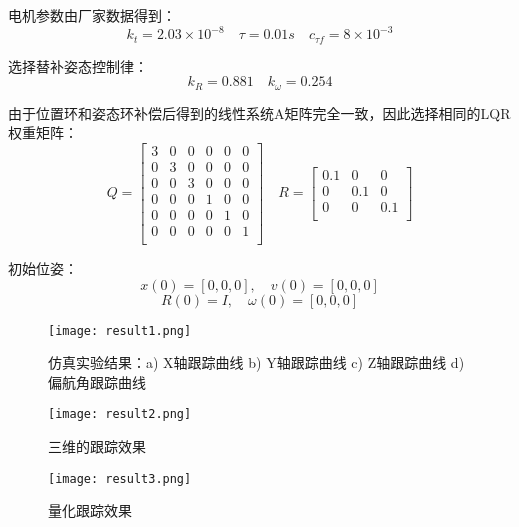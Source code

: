   电机参数由厂家数据得到：
  $$k_t=2.03\times 10^{-8} \quad 
  \tau=0.01s \quad
  c_{\tau f}=8\times 10^{-3}$$

  选择替补姿态控制律：
  $$k_R=0.881 \quad k_\omega=0.254$$

  由于位置环和姿态环补偿后得到的线性系统A矩阵完全一致，因此选择相同的LQR权重矩阵：
  $$Q=\begin{bmatrix}
    3&0&0&0&0&0\\
    0&3&0&0&0&0\\
    0&0&3&0&0&0\\
    0&0&0&1&0&0\\
    0&0&0&0&1&0\\
    0&0&0&0&0&1\\
  \end{bmatrix} \quad R=\begin{bmatrix}
    0.1 &0 &0\\
    0 &0.1 &0\\
    0 &0 &0.1\\
  \end{bmatrix}$$

  初始位姿：
  $$x(0)=[0,0,0],\quad v(0)=[0,0,0]$$
  $$R(0)=I , \quad \omega(0)=[0,0,0]$$

  \begin{figure}[!h]
    \centering
    \texttt{[image: result1.png]}
    \caption{仿真实验结果：a) X轴跟踪曲线 b) Y轴跟踪曲线 c) Z轴跟踪曲线 d) 偏航角跟踪曲线}
    \label{fig:result1}
  \end{figure}

  \begin{figure}[!h]
    \centering
    \texttt{[image: result2.png]}
    \caption{三维的跟踪效果}
    \label{fig:result2}
  \end{figure}

  \begin{figure}[!h]
    \centering
    \texttt{[image: result3.png]}
    \caption{量化跟踪效果}
    \label{fig:result3}
  \end{figure}